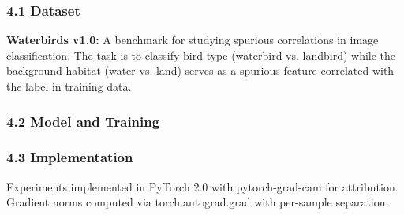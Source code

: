 
\subsubsection{4.1 Dataset}

\textbf{Waterbirds v1.0:} A benchmark for studying spurious correlations in image classification. The task is to classify bird type (waterbird vs. landbird) while the background habitat (water vs. land) serves as a spurious feature correlated with the label in training data.

\begin{table}[htbp]
\centering
{}
\end{table}

\subsubsection{4.2 Model and Training}

\begin{table}[htbp]
\centering
{}
\end{table}

\subsubsection{4.3 Implementation}

Experiments implemented in PyTorch 2.0 with pytorch-grad-cam for attribution. Gradient norms computed via torch.autograd.grad with per-sample separation.
